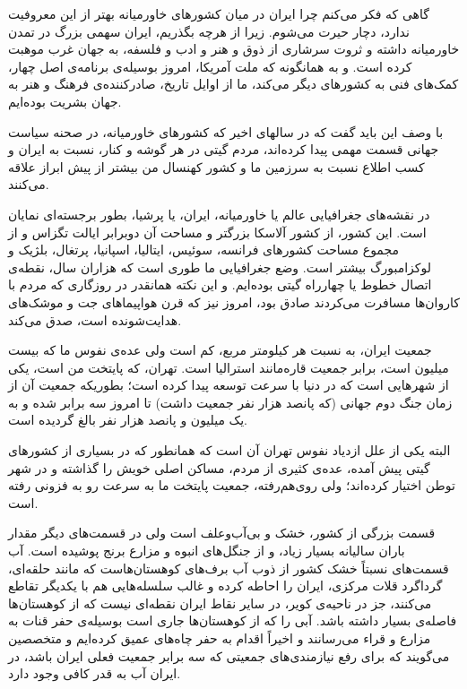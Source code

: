 \par
گاهی که فکر می‌کنم چرا ایران در میان کشورهای خاورمیانه بهتر از این معروفیت ندارد، دچار حیرت می‌شوم. زیرا از هرچه بگذریم، ایران سهمی بزرگ در تمدن خاورمیانه داشته و  ثروت سرشاری از ذوق و هنر و ادب و فلسفه، به جهان غرب موهبت کرده است. و به همانگونه که ملت آمریکا، امروز بوسیله‌ی برنامه‌ی اصل چهار، کمک‌های فنی به کشورهای دیگر می‌کند، ما از اوایل تاریخ، صادرکننده‌ی فرهنگ و هنر به جهان بشریت بوده‌ایم. 
\par
با وصف این باید گفت که در سالهای اخیر که کشورهای خاورمیانه، در صحنه سیاست جهانی قسمت مهمی پیدا کرده‌اند، مردم گیتی در هر گوشه و کنار، نسبت به ایران و کسب اطلاع نسبت به سرزمین ما و کشور کهنسال من بیشتر از پیش ابراز علاقه می‌کنند. 
\par
در نقشه‌های جغرافیایی عالم یا خاورمیانه، ایران، یا پرشیا، بطور برجسته‌ای نمایان است. این کشور، از کشور آلاسکا بزرگتر و مساحت آن دوبرابر ایالت تگزاس و از مجموع مساحت کشورهای فرانسه، سوئیس، ایتالیا، اسپانیا، پرتغال، بلژیک و لوکزامبورگ بیشتر است.
وضع جغرافیایی ما طوری است که هزاران سال، نقطه‌ی اتصال خطوط یا چهارراه گیتی بوده‌ایم. و این نکته همانقدر در روزگاری که مردم با کاروان‌ها مسافرت می‌کردند صادق بود، امروز نیز که قرن هواپیماهای جت و موشک‌های هدایت‌شونده است، صدق می‌کند. 
\par
جمعیت ایران، به نسبت هر کیلومتر مربع، کم است ولی عده‌ی نفوس ما که بیست میلیون است، برابر جمعیت قاره‌مانند استرالیا است.
تهران، که پایتخت من است، یکی از شهرهایی است که در دنیا با سرعت توسعه پیدا کرده است؛ بطوریکه جمعیت آن از زمان جنگ دوم جهانی (که پانصد هزار نفر جمعیت داشت) تا امروز سه برابر شده و به یک میلیون و پانصد هزار نفر بالغ گردیده است.
\par
البته یکی از علل ازدیاد نفوس تهران آن است که همانطور که در بسیاری از کشورهای گیتی پیش آمده، عده‌ی کثیری از مردم، مساکن اصلی خویش را گذاشته و در شهر توطن اختیار کرده‌اند؛ ولی روی‌هم‌رفته، جمعیت پایتخت ما به سرعت رو به فزونی رفته است.
\par
قسمت بزرگی از کشور، خشک و بی‌آب‌وعلف است ولی در قسمت‌های دیگر مقدار باران سالیانه بسیار زیاد، و از جنگل‌های انبوه و مزارع برنج پوشیده است. آب قسمت‌‌های نسبتاً خشک کشور از ذوب آب برف‌های کوهستان‌هاست که مانند حلقه‌ای، گرداگرد قلات مرکزی، ایران را احاطه کرده و غالب سلسله‌هایی هم با یکدیگر تقاطع می‌کنند، جز در ناحیه‌ی کویر، در سایر نقاط ایران نقطه‌ای نیست که از کوهستان‌ها فاصله‌ی بسیار داشته باشد. آبی را که از کوهستان‌ها جاری است بوسیله‌ی حفر قنات به مزارع و قراء می‌رسانند و اخیراً اقدام به حفر چاه‌های عمیق کرده‌ایم و متخصصین می‌گویند که برای رفع نیازمندی‌های جمعیتی که سه برابر جمعیت فعلی ایران باشد، در ایران آب به قدر کافی وجود دارد.
